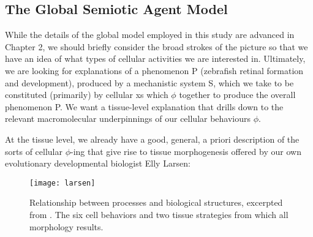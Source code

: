 \subsection{The Global Semiotic Agent Model}
\label{agentmodel}

While the details of the global model employed in this study are advanced in Chapter 2, we should briefly consider the broad strokes of the picture so that we have an idea of what types of cellular activities we are interested in. Ultimately, we are looking for explanations of a phenomenon P (zebrafish retinal formation and development), produced by a mechanistic system S, which we take to be constituted (primarily) by cellular xs which $\phi$ together to produce the overall phenomenon P. We want a tissue-level explanation that drills down to the relevant macromolecular underpinnings of our cellular behaviours $\phi$.

At the tissue level, we already have a good, general, a priori description of the sorts of cellular $\phi$-ing that give rise to tissue morphogenesis offered by our own evolutionary developmental biologist Elly Larsen:

\label{alphabet}

\begin{wrapfigure}{2}{0.4\textwidth}
\texttt{[image: larsen]}
\caption{Relationship between processes and biological
structures, excerpted from \cite{Larsen1992}. The six cell behaviors and two tissue strategies from which all morphology results.}
\label{fig:Larsen}
\end{wrapfigure}

